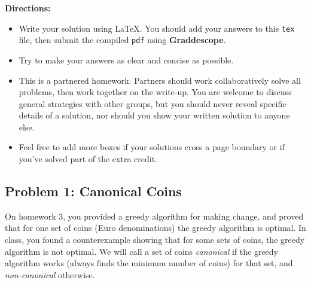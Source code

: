 \documentclass[11pt]{article}
\newcommand{\titlebox}[4]{
    \begin{center}
        \framebox{
            \vbox{
            \hbox to \textwidth { #1 \hfill #3}
            \vspace{-4mm}
            \hbox to \textwidth {\hfill \Large \bf #2 \hfill}
            \hbox to \textwidth { {\it \hfill Due #4 \hfill} }
        }
    }
    \end{center}
}
\begin{document}
\titlebox{CSC 321}
{Homework 4}
{\textcolor{red}{your names go here}} %
{November 4\textsuperscript{th}, 2019}

\textbf{Directions:}
\begin{itemize}
\item Write your solution using \LaTeX.
You should add your answers to this \texttt{tex} file,
then submit the compiled \texttt{pdf} using \textbf{Graddescope}.

\item Try to make your answers as clear and concise as possible.

\item This is a partnered homework.
Partners should work collaboratively solve all problems,
then work together on the write-up.
You are welcome to discuss general strategies with other groups,
but you should never reveal specific details of a solution,
nor should you show your written solution to anyone else.

\item Feel free to add more boxes if your solutions cross a page boundary or if you've solved part of the extra credit.

\end{itemize}






\subsection*{Problem 1: Canonical Coins}




On homework 3, you provided a greedy algorithm for making change, and proved that for one set of coins (Euro denominations) the greedy algorithm is optimal.
In class, you found a counterexample showing that for some sets of coins, the greedy algorithm is not optimal.
We will call a set of coins \emph{canonical} if the greedy algorithm works (always finds the minimum number of coins) for that set, and \emph{non-canonical} otherwise.
\end{document}
